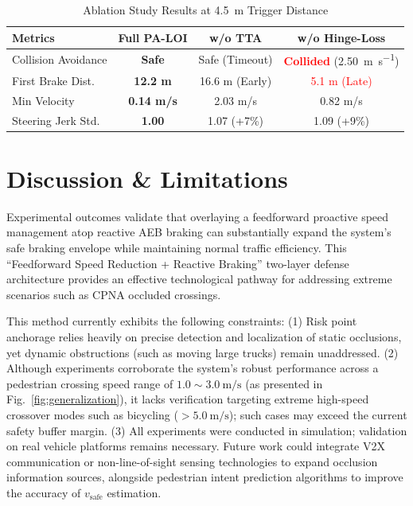 \documentclass[letterpaper, 10 pt, conference]{ieeeconf}  %
\begin{document}
\begin{table}[htbp]
\caption{Ablation Study Results at \SI{4.5}{\meter} Trigger Distance}
\label{tab:ablation}
\centering
\begin{tabular}{lccc}
\toprule
\textbf{Metrics} & \textbf{Full PA-LOI} & \textbf{w/o TTA} & \textbf{w/o Hinge-Loss} \\
\midrule
Collision Avoidance & \textbf{Safe} & Safe (Timeout) & \textcolor{red}{\textbf{Collided}} (\SI{2.50}{\meter\per\second}) \\
First Brake Dist.   & \textbf{12.2 m} & 16.6 m (Early) & \textcolor{red}{5.1 m (Late)} \\
Min Velocity        & \textbf{0.14 m/s} & 2.03 m/s & 0.82 m/s \\
Steering Jerk Std.  & \textbf{1.00} & 1.07 (+7\%) & 1.09 (+9\%) \\
\bottomrule
\end{tabular}
\end{table}

\section{Discussion \& Limitations}

Experimental outcomes validate that overlaying a feedforward proactive speed management atop reactive AEB braking can substantially expand the system's safe braking envelope while maintaining normal traffic efficiency. This ``Feedforward Speed Reduction + Reactive Braking'' two-layer defense architecture provides an effective technological pathway for addressing extreme scenarios such as CPNA occluded crossings.

This method currently exhibits the following constraints: (1) Risk point anchorage relies heavily on precise detection and localization of static occlusions, yet dynamic obstructions (such as moving large trucks) remain unaddressed. (2) Although experiments corroborate the system's robust performance across a pedestrian crossing speed range of $1.0\sim\SI{3.0}{\meter\per\second}$ (as presented in Fig.~\ref{fig:generalization}), it lacks verification targeting extreme high-speed crossover modes such as bicycling ($>\SI{5.0}{\meter\per\second}$); such cases may exceed the current safety buffer margin. (3) All experiments were conducted in simulation; validation on real vehicle platforms remains necessary. Future work could integrate V2X communication or non-line-of-sight sensing technologies to expand occlusion information sources, alongside pedestrian intent prediction algorithms to improve the accuracy of $v_{\text{safe}}$ estimation.
\end{document}
